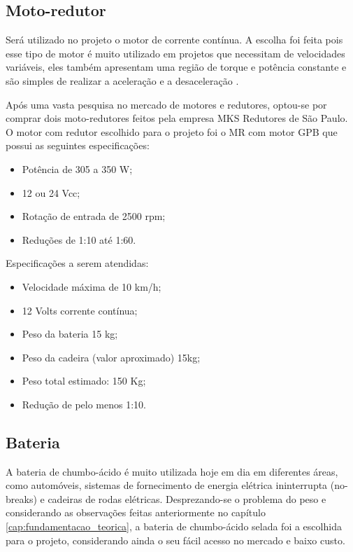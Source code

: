   \subsection{Moto-redutor}

  Será utilizado no projeto o motor de corrente contínua. A escolha foi feita pois esse tipo de motor é muito utilizado em projetos que necessitam de velocidades variáveis, eles também apresentam uma região de torque e potência constante e são simples de realizar a aceleração e a desaceleração \cite{manual_bateria_unipower}.

  Após uma vasta pesquisa no mercado de motores e redutores, optou-se por comprar dois moto-redutores feitos pela empresa MKS Redutores de São Paulo. O motor com redutor escolhido para o projeto foi o MR com motor GPB que possui as seguintes especificações:

  \begin{itemize}
    \item Potência de 305 a 350 W;
    \item 12 ou 24 Vcc;
    \item Rotação de entrada de 2500 rpm;
    \item Reduções de 1:10 até 1:60.
  \end{itemize}

  Especificações a serem atendidas:

  \begin{itemize}
    \item Velocidade máxima de 10 km/h;
    \item 12 Volts corrente contínua;
    \item Peso da bateria 15 kg;
    \item Peso da cadeira (valor aproximado) 15kg;
    \item Peso total estimado: 150 Kg;
    \item Redução de pelo menos 1:10.
  \end{itemize}

  \subsection{Bateria}

  A bateria de chumbo-ácido é muito utilizada hoje em dia em diferentes áreas, como automóveis, sistemas de fornecimento de energia elétrica ininterrupta (no-breaks) e cadeiras de rodas elétricas. Desprezando-se o problema do peso e considerando as observações feitas anteriormente no capítulo \ref{cap:fundamentacao_teorica}, a bateria de chumbo-ácido selada foi a escolhida para o projeto, considerando ainda o seu fácil acesso no mercado e baixo custo.

